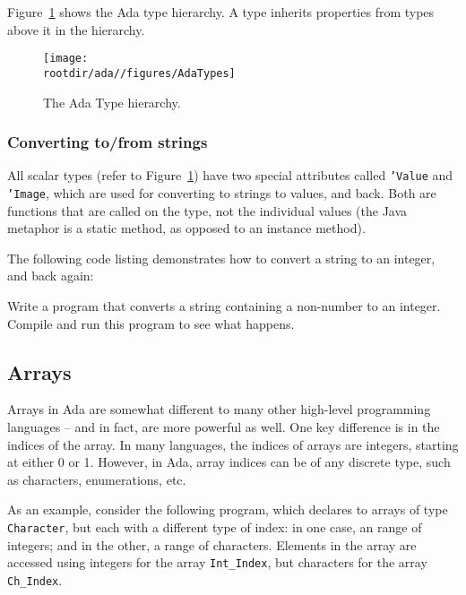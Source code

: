 Figure~\ref{fig:ada:type-hierarchy} shows the Ada type hierarchy. A type inherits properties from types above it in the hierarchy. 

  \begin{figure}[!h]
   \centering
    \texttt{[image: \\rootdir/ada//figures/AdaTypes]}
   \caption{The Ada Type hierarchy.}
   \label{fig:ada:type-hierarchy}
  \end{figure}

\subsubsection{Converting to/from strings}

All scalar types (refer to Figure~\ref{fig:ada:type-hierarchy}) have two special attributes called \texttt{'Value} and \texttt{'Image}, which are used for converting to strings to values, and back. Both are functions that are called on the type, not the individual values (the Java metaphor is a static method, as opposed to an instance method).

The following code listing demonstrates how to convert a string to an integer, and back again:

  

\begin{exercise}
Write a program that converts a string containing a non-number to an integer. Compile and run this program to see what happens.
\end{exercise}


 \subsection{Arrays}

Arrays in Ada are somewhat different to many other high-level programming languages -- and in fact, are more powerful as well. One key difference is in the indices of the array. In many languages, the indices of arrays are integers, starting at either 0 or 1. However, in Ada, array indices can be of any discrete type, such as characters, enumerations, etc. 

As an example, consider the following program, which declares to arrays of type \texttt{Character}, but each with a different type of index: in one case, an range of integers; and in the other, a range of characters. Elements in the array are accessed using integers for the array \texttt{Int\_Index}, but characters for the array \texttt{Ch\_Index}.

